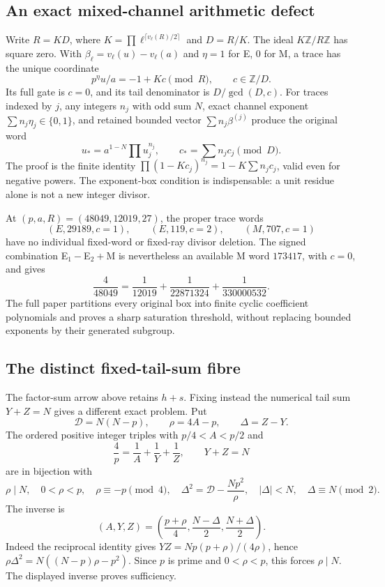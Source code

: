 \documentclass[10pt,reqno]{amsart}
\begin{document}
\subsection*{An exact mixed-channel arithmetic defect}
Write $R=KD$, where
$K=\prod\ell^{\lceil v_\ell(R)/2\rceil}$ and $D=R/K$.
The ideal $K\mathbb Z/R\mathbb Z$ has square zero. With
$\beta_\ell=v_\ell(u)-v_\ell(a)$ and $\eta=1$ for E, $0$ for M,
a trace has the unique coordinate
\[
 p^\eta u/a=-1+Kc\pmod R,\qquad c\in\mathbb Z/D.
\]
Its full gate is $c=0$, and its tail denominator is $D/\gcd(D,c)$.
For traces indexed by $j$, any integers $n_j$ with odd sum $N$, exact
channel exponent $\sum n_j\eta_j\in\{0,1\}$, and retained bounded vector
$\sum n_j\beta^{(j)}$ produce the original word
\[
 u_*=a^{1-N}\prod u_j^{n_j},\qquad c_*=\sum n_jc_j\pmod D.
\]
The proof is the finite identity
$\prod(1-Kc_j)^{n_j}=1-K\sum n_jc_j$, valid even for negative powers.
The exponent-box condition is indispensable: a unit residue alone is not a
new integer divisor.

At $(p,a,R)=(48049,12019,27)$, the proper trace words
\[
 (E,29189,c=1),\qquad(E,119,c=2),\qquad(M,707,c=1)
\]
have no individual fixed-word or fixed-ray divisor deletion. The signed
combination E$_1-$E$_2+$M is nevertheless an available M word
$173417$, with $c=0$, and gives
\[
 \frac4{48049}=\frac1{12019}+\frac1{22871324}+\frac1{330000532}.
\]
The full paper partitions every original box into finite cyclic coefficient
polynomials and proves a sharp saturation threshold, without replacing
bounded exponents by their generated subgroup.



\subsection*{The distinct fixed-tail-sum fibre}
The factor-sum arrow above retains $h+s$.  Fixing instead the numerical tail
sum $Y+Z=N$ gives a different exact problem.  Put
\[
 \mathcal D=N(N-p),\qquad \rho=4A-p,\qquad \Delta=Z-Y.
\]
The ordered positive integer triples with $p/4<A<p/2$ and
\[
 \frac4p=\frac1A+\frac1Y+\frac1Z,\qquad Y+Z=N
\]
are in bijection with
\[
 \rho\mid N,\quad 0<\rho<p,\quad \rho\equiv-p\pmod4,\quad
 \Delta^2=\mathcal D-\frac{Np^2}{\rho},\quad
 |\Delta|<N,\quad \Delta\equiv N\pmod2.
\]
The inverse is
\[
 (A,Y,Z)=\left(\frac{p+\rho}{4},\frac{N-\Delta}{2},
                    \frac{N+\Delta}{2}\right).
\]
Indeed the reciprocal identity gives
$YZ=Np(p+\rho)/(4\rho)$, hence
$\rho\Delta^2=N((N-p)\rho-p^2)$.  Since $p$ is prime and $0<\rho<p$,
this forces $\rho\mid N$.  The displayed inverse proves sufficiency.
\end{document}
